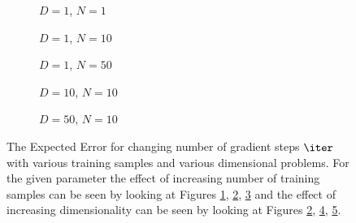 \begin{figure}[h!]
  \centering
    \begin{subfigure}{0.3\textwidth}
      \centering
      \caption{$D=1$, $N=1$}
      \label{fig:linear-n_iter-N-1-D-1}
    \end{subfigure}
    \begin{subfigure}{0.3\textwidth}
      \centering
      \caption{$D=1$, $N=10$}
      \label{fig:linear-n_iter-N-10-D-1}
    \end{subfigure}
    \begin{subfigure}{0.3\textwidth}
      \centering
      \caption{$D=1$, $N=50$}
      \label{fig:linear-n_iter-N-50-D-1}
    \end{subfigure}

    \begin{subfigure}{0.3\textwidth}
      \centering
      \caption{$D=10$, $N=10$}
      \label{fig:linear-n_iter-N-10-D-10}
    \end{subfigure}
    \begin{subfigure}{0.3\textwidth}
      \centering
      \caption{$D=50$, $N=10$}
      \label{fig:linear-n_iter-N-10-D-50}
    \end{subfigure}  

  \caption{The Expected Error for changing number of gradient steps $\iter$ with various training samples and various dimensional problems. For the given parameter the effect of increasing number of training samples can be seen by looking at Figures \ref{fig:linear-n_iter-N-1-D-1}, \ref{fig:linear-n_iter-N-10-D-1}, \ref{fig:linear-n_iter-N-50-D-1} and the effect of increasing dimensionality can be seen by looking at Figures \ref{fig:linear-n_iter-N-10-D-1}, \ref{fig:linear-n_iter-N-10-D-10}, \ref{fig:linear-n_iter-N-10-D-50}.}\label{fig:linear-n_iter}
\end{figure}


